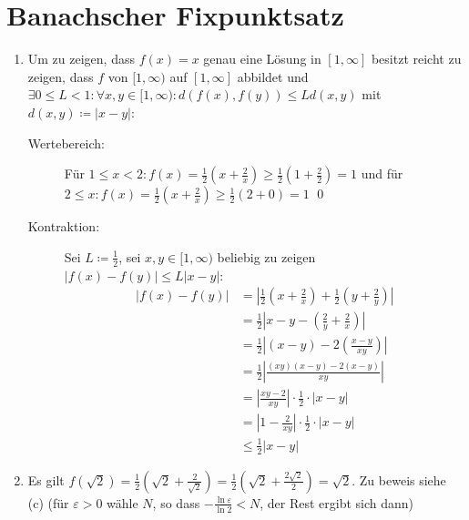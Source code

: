 \documentclass[sectionformat=aufgabe]{gadsescript}
\begin{document}
\section{Banachscher Fixpunktsatz}
\begin{enumerate}[label=(\alph*)]
	\item Um zu zeigen, dass $ f(x) = x $ genau eine Lösung in $ [1, \infty] $ besitzt reicht zu zeigen, dass $ f $ von $ [1, \infty) $ auf $ [1, \infty] $ abbildet und $ \exists 0 \leq L < 1 : \forall x, y \in [1, \infty) : d(f(x), f(y)) \leq L d(x, y) $ mit $ d(x, y) \coloneqq \left| x - y \right|  $:
		\begin{description}
			\item[Wertebereich:] Für $ 1 \leq x < 2 : f(x) = \frac{ 1 }{ 2 } \left(x + \frac{ 2 }{ x } \right) \geq  \frac{ 1 }{ 2 } \left( 1 + \frac{ 2 }{ 2 }  \right) = 1 $
				und für $ 2 \leq x : f(x) = \frac{ 1 }{ 2 } \left( x + \frac{ 2 }{ x }  \right) \geq \frac{ 1 }{ 2 } \left( 2 + 0 \right) = 1 $ \qed
			\item[Kontraktion:] Sei $ L \coloneqq \frac{ 1 }{ 2 }  $, sei $ x, y \in [1, \infty) $ beliebig zu zeigen $ \left| f(x) - f(y) \right| \leq L \left| x - y \right|  $:
				\begin{align*}
					\left| f(x) - f(y) \right| &= \left| \frac{ 1 }{ 2 } \left( x + \frac{ 2 }{ x }  \right) + \frac{ 1 }{ 2 } \left( y + \frac{ 2 }{ y }  \right)  \right|  \\
								   &= \frac{ 1 }{ 2 } \left| x - y - \left( \frac{ 2 }{ y } + \frac{ 2 }{ x }  \right)  \right| \\
								   &= \frac{ 1 }{ 2 } \left| \left( x - y \right) - 2 \left( \frac{ x - y }{ xy }  \right)  \right|  \\
								   &= \frac{ 1 }{ 2 } \left| \frac{ (xy) ( x - y ) - 2 (x - y) }{ xy }  \right|  \\
								   &= \left| \frac{ xy - 2 }{ xy }  \right| \cdot \frac{ 1 }{ 2 } \cdot \left| x - y \right|  \\
								   &= \left| 1 - \frac{ 2 }{ xy }  \right| \cdot \frac{ 1 }{ 2 } \cdot \left| x - y \right|  \\
								   &\leq \frac{ 1 }{ 2 } \left| x - y \right| 
				\end{align*}
		\end{description}
	\item Es gilt $ f\left( \sqrt{2}  \right) = \frac{ 1 }{ 2 } \left( \sqrt{2} + \frac{ 2 }{ \sqrt{2}  }  \right) = \frac{ 1 }{ 2 } \left( \sqrt{2} + \frac{ 2 \sqrt{2} }{ 2 }  \right) = \sqrt{2}  $. Zu beweis siehe (c) (für $ \varepsilon > 0 $ wähle $ N $, so dass $ - \frac{ \ln \varepsilon }{ \ln 2  } < N $, der Rest ergibt sich dann)

\end{enumerate}
\end{document}
